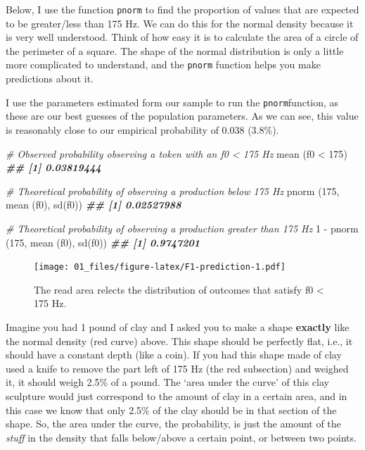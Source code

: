 \documentclass[
]{book}
\newenvironment{Shaded}{\begin{snugshade}}{\end{snugshade}}
\newcommand{\CommentTok}[1]{\textcolor[rgb]{0.56,0.35,0.01}{\textit{#1}}}
\newcommand{\DecValTok}[1]{\textcolor[rgb]{0.00,0.00,0.81}{#1}}
\newcommand{\DocumentationTok}[1]{\textcolor[rgb]{0.56,0.35,0.01}{\textbf{\textit{#1}}}}
\newcommand{\FunctionTok}[1]{\textcolor[rgb]{0.00,0.00,0.00}{#1}}
\newcommand{\NormalTok}[1]{#1}
\newcommand{\SpecialCharTok}[1]{\textcolor[rgb]{0.00,0.00,0.00}{#1}}
\begin{document}
Below, I use the function \texttt{pnorm} to find the proportion of values that are expected to be greater/less than 175 Hz. We can do this for the normal density because it is very well understood. Think of how easy it is to calculate the area of a circle of the perimeter of a square. The shape of the normal distribution is only a little more complicated to understand, and the \texttt{pnorm} function helps you make predictions about it.

I use the parameters estimated form our sample to run the \texttt{pnorm}function, as these are our best guesses of the population parameters. As we can see, this value is reasonably close to our empirical probability of 0.038 (3.8\%).

\begin{Shaded}
\begin{Highlighting}[]
\CommentTok{\# Observed probability observing a token with an f0 \textless{} 175 Hz}
\FunctionTok{mean}\NormalTok{ (f0 }\SpecialCharTok{\textless{}} \DecValTok{175}\NormalTok{)}
\DocumentationTok{\#\# [1] 0.03819444}

\CommentTok{\# Theoretical probability of observing a production below 175 Hz}
\FunctionTok{pnorm}\NormalTok{ (}\DecValTok{175}\NormalTok{, }\FunctionTok{mean}\NormalTok{ (f0), }\FunctionTok{sd}\NormalTok{(f0))}
\DocumentationTok{\#\# [1] 0.02527988}

\CommentTok{\# Theoretical probability of observing a production greater than 175 Hz}
\DecValTok{1} \SpecialCharTok{{-}} \FunctionTok{pnorm}\NormalTok{ (}\DecValTok{175}\NormalTok{, }\FunctionTok{mean}\NormalTok{ (f0), }\FunctionTok{sd}\NormalTok{(f0))}
\DocumentationTok{\#\# [1] 0.9747201}
\end{Highlighting}
\end{Shaded}

\begin{figure}
\centering
\texttt{[image: 01\_files/figure-latex/F1-prediction-1.pdf]}
\caption{\label{fig:F1-prediction}The read area relects the distribution of outcomes that satisfy f0 \textless{} 175 Hz.}
\end{figure}

Imagine you had 1 pound of clay and I asked you to make a shape \textbf{exactly} like the normal density (red curve) above. This shape should be perfectly flat, i.e., it should have a constant depth (like a coin). If you had this shape made of clay used a knife to remove the part left of 175 Hz (the red subsection) and weighed it, it should weigh 2.5\% of a pound. The `area under the curve' of this clay sculpture would just correspond to the amount of clay in a certain area, and in this case we know that only 2.5\% of the clay should be in that section of the shape. So, the area under the curve, the probability, is just the amount of the \emph{stuff} in the density that falls below/above a certain point, or between two points.
\end{document}
